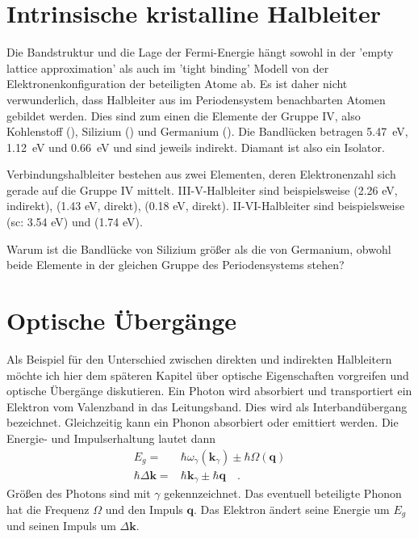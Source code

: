 \section{Intrinsische kristalline Halbleiter}

Die Bandstruktur und die Lage der Fermi-Energie hängt sowohl in der 'empty lattice approximation' als auch im 'tight binding' Modell von der Elektronenkonfiguration der beteiligten Atome ab. Es ist daher nicht verwunderlich, dass Halbleiter aus im Periodensystem benachbarten Atomen gebildet werden. Dies sind zum einen die Elemente der Gruppe IV, also Kohlenstoff (), Silizium () und Germanium (). Die Bandlücken betragen 5.47~eV, 1.12~eV und 0.66~eV und sind jeweils indirekt. Diamant ist also ein Isolator.

Verbindungshalbleiter bestehen aus zwei Elementen, deren Elektronenzahl sich gerade auf die Gruppe IV mittelt. III-V-Halbleiter sind beispielsweise  (2.26 eV, indirekt),  (1.43 eV, direkt),  (0.18 eV, direkt). II-VI-Halbleiter sind beispielsweise  (sc: 3.54 eV) und  (1.74 eV).



\begin{questions}
    \item Warum ist die Bandlücke von Silizium größer als die von Germanium, obwohl beide Elemente in der gleichen Gruppe des Periodensystems stehen?
\end{questions}


\section{Optische Übergänge}

Als Beispiel für den Unterschied zwischen direkten und indirekten Halbleitern möchte ich hier dem späteren Kapitel über optische Eigenschaften vorgreifen und optische Übergänge diskutieren. Ein Photon wird absorbiert und transportiert ein Elektron vom Valenzband in das Leitungsband. Dies wird als Interbandübergang bezeichnet. Gleichzeitig kann ein Phonon absorbiert oder emittiert werden. Die Energie- und Impulserhaltung lautet dann
\begin{align}
    E_g = & \hbar \omega_\gamma(\mathbf{k}_\gamma ) \pm \hbar \Omega (\mathbf{q}) \\
    \hbar \Delta \mathbf{k} = &\hbar \mathbf{k}_\gamma \pm \hbar \mathbf{q} \quad .
\end{align}
Größen des Photons sind mit $\gamma$ gekennzeichnet. Das eventuell beteiligte Phonon hat die Frequenz $\Omega$ und den Impuls $\mathbf{q}$. Das Elektron ändert seine Energie um $E_g$ und seinen Impuls um $\Delta \mathbf{k}$.



